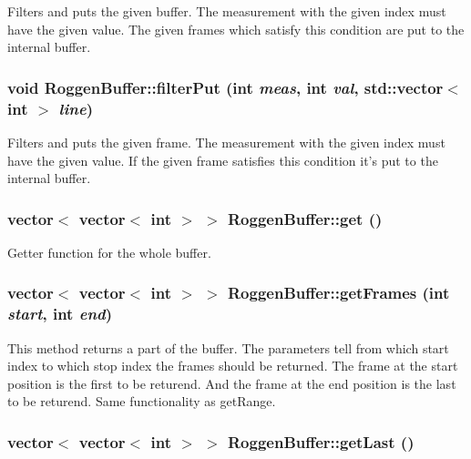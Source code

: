 \label{classRoggenBuffer_a22ac37e59b6943d9f1996a43e58af190}
Filters and puts the given buffer. The measurement with the given index must have the given value. The given frames which satisfy this condition are put to the internal buffer. \hypertarget{classRoggenBuffer_a42941bfb6c6319a1317f5da3c670facf}{
\subsubsection[{filterPut}]{\setlength{\rightskip}{0pt plus 5cm}void RoggenBuffer::filterPut (int {\em meas}, \/  int {\em val}, \/  std::vector$<$ int $>$ {\em line})}}
\label{classRoggenBuffer_a42941bfb6c6319a1317f5da3c670facf}
Filters and puts the given frame. The measurement with the given index must have the given value. If the given frame satisfies this condition it's put to the internal buffer. \hypertarget{classRoggenBuffer_a7e4c7aa19aa7c900e2bbf00d23c698a1}{
\subsubsection[{get}]{\setlength{\rightskip}{0pt plus 5cm}vector$<$ vector$<$ int $>$ $>$ RoggenBuffer::get ()}}
\label{classRoggenBuffer_a7e4c7aa19aa7c900e2bbf00d23c698a1}
Getter function for the whole buffer. \hypertarget{classRoggenBuffer_a466876e9c5f87bf762467c97ae907048}{
\subsubsection[{getFrames}]{\setlength{\rightskip}{0pt plus 5cm}vector$<$ vector$<$ int $>$ $>$ RoggenBuffer::getFrames (int {\em start}, \/  int {\em end})}}
\label{classRoggenBuffer_a466876e9c5f87bf762467c97ae907048}
This method returns a part of the buffer. The parameters tell from which start index to which stop index the frames should be returned. The frame at the start position is the first to be returend. And the frame at the end position is the last to be returend. Same functionality as getRange. \hypertarget{classRoggenBuffer_a1c1ee753d0654159c62a0ee4ae95d9a0}{
\subsubsection[{getLast}]{\setlength{\rightskip}{0pt plus 5cm}vector$<$ vector$<$ int $>$ $>$ RoggenBuffer::getLast ()}}
